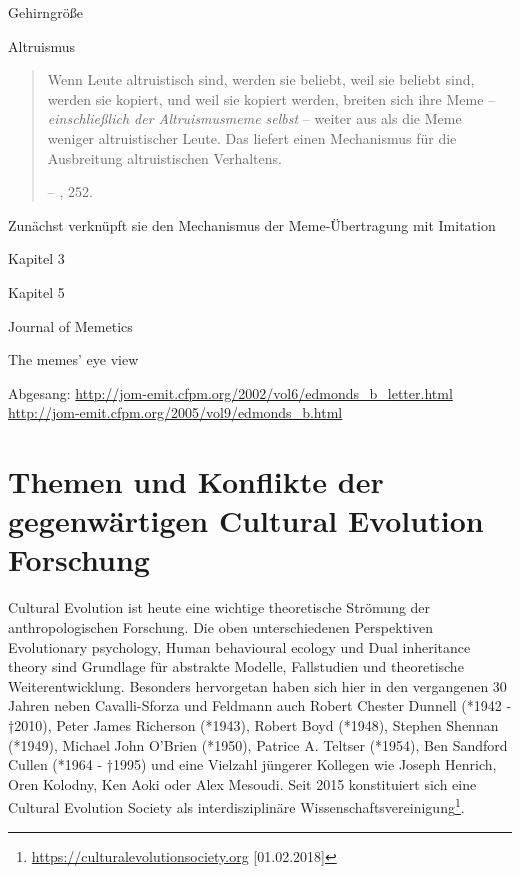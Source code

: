 \documentclass[openany,twoside,twocolumn]{book}
\let\rmarkdownfootnote\footnote%
\def\footnote{\protect\rmarkdownfootnote}
\begin{document}
Gehirngröße

Altruismus

\begin{quote}
Wenn Leute altruistisch sind, werden sie beliebt, weil sie beliebt sind,
werden sie kopiert, und weil sie kopiert werden, breiten sich ihre Meme
-- \emph{einschließlich der Altruismusmeme selbst} -- weiter aus als die
Meme weniger altruistischer Leute. Das liefert einen Mechanismus für die
Ausbreitung altruistischen Verhaltens.

-- \textcite{blackmore_macht_2000}, 252.
\end{quote}

Zunächst verknüpft sie den Mechanismus der Meme-Übertragung mit
Imitation

Kapitel 3

Kapitel 5

Journal of Memetics

The memes' eye view

Abgesang: \url{http://jom-emit.cfpm.org/2002/vol6/edmonds_b_letter.html}
\url{http://jom-emit.cfpm.org/2005/vol9/edmonds_b.html}

\hypertarget{themen-und-konflikte-der-gegenwartigen-cultural-evolution-forschung}{%
\section{Themen und Konflikte der gegenwärtigen Cultural Evolution
Forschung}\label{themen-und-konflikte-der-gegenwartigen-cultural-evolution-forschung}}

Cultural Evolution ist heute eine wichtige theoretische Strömung der
anthropologischen Forschung. Die oben unterschiedenen Perspektiven
Evolutionary psychology, Human behavioural ecology und Dual inheritance
theory sind Grundlage für abstrakte Modelle, Fallstudien und
theoretische Weiterentwicklung. Besonders hervorgetan haben sich hier in
den vergangenen 30 Jahren neben Cavalli-Sforza und Feldmann auch Robert
Chester Dunnell (*1942 - †2010), Peter James Richerson (*1943), Robert
Boyd (*1948), Stephen Shennan (*1949), Michael John O'Brien (*1950),
Patrice A. Teltser (*1954), Ben Sandford Cullen (*1964 - †1995) und eine
Vielzahl jüngerer Kollegen wie Joseph Henrich, Oren Kolodny, Ken Aoki
oder Alex Mesoudi. Seit 2015 konstituiert sich eine Cultural Evolution
Society als interdisziplinäre Wissenschaftsvereinigung\footnote{\url{https://culturalevolutionsociety.org}
  {[}01.02.2018{]}}.
\end{document}
